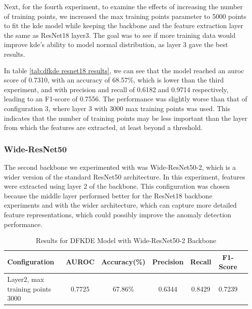 Next, for the fourth experiment, to examine the effects of increasing the number of training points, we increased the max training points parameter to 5000 points to fit the \gls{kde} model while keeping the backbone and the feature extraction layer the same as ResNet18 layer3. The goal was to see if more training data would improve \gls{kde}'s ability to model normal distribution, as layer 3 gave the best results.

In table \ref{tab:dfkde resnet18 results}, we can see that the model reached an \gls{auroc} score of 0.7310, with an accuracy of 68.57\%, which is lower than the third experiment, and with precision and recall of 0.6182 and 0.9714 respectively, leading to an F1-score of 0.7556. The performance was slightly worse than that of configuration 3, where layer 3 with 3000 max training points was used. This indicates that the number of training points may be less important than the layer from which the features are extracted, at least beyond a threshold.

\subsubsection*{Wide-ResNet50}

The second backbone we experimented with was Wide-ResNet50-2, which is a wider version of the standard ResNet50 architecture. In this experiment, features were extracted using layer 2 of the backbone. This configuration was chosen because the middle layer performed better for the ResNet18 backbone experiments and with the wider architecture, which can capture more detailed feature representations, which could possibly improve the anomaly detection performance.

\begin{table}[ht!]
    \centering
    \begin{tabular}{|l|c|c|c|c|c|c|}
        \hline
        \textbf{Configuration} & \textbf{AUROC} & \textbf{Accuracy(\%)} & \textbf{Precision} & \textbf{Recall} & \textbf{F1-Score} \\ \hline
        Layer2, max training points 3000 & 0.7725 & 67.86\% & 0.6344 & 0.8429 & 0.7239 \\ \hline
    \end{tabular}
    \caption{Results for DFKDE Model with Wide-ResNet50-2 Backbone}
    \label{tab:dfkde wide-resnet50 results}
\end{table}



